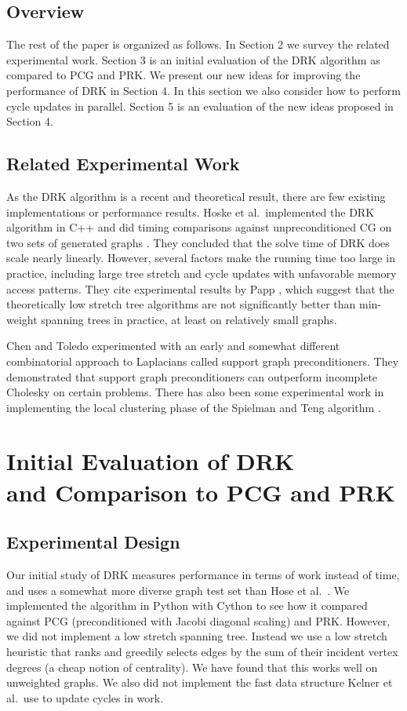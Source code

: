 \documentclass{sig-alternate}
\begin{document}
\subsection{Overview}
The rest of the paper is organized as follows.
In Section 2 we survey  the related experimental work.
Section 3 is an initial evaluation of the DRK algorithm
as compared to PCG and PRK.
We present our new ideas for improving the performance of DRK in Section 4.
In this section we also consider how to perform cycle updates
in parallel.
Section 5 is an evaluation of the new ideas proposed in Section 4.

\subsection{Related Experimental Work}
As the DRK algorithm is a recent and theoretical
result, there are few existing implementations or performance results.
Hoske et al.\ implemented the DRK algorithm in C++ and did timing comparisons
against unpreconditioned CG on two sets of generated graphs \cite{HLMW15}.
They concluded that the solve time of DRK
does scale nearly linearly.
However, several factors make the running time too large in practice,
including large tree stretch and cycle updates
with unfavorable memory access patterns.
They cite
experimental results by Papp \cite{Paap2014}, which
suggest that the theoretically low stretch tree algorithms
are not significantly better than min-weight spanning trees in
practice, at least on relatively small graphs.

Chen and Toledo \cite{ChenToledo2003} experimented with
an early and somewhat different combinatorial approach to Laplacians
called support graph preconditioners. They demonstrated that support graph
preconditioners can outperform incomplete Cholesky on certain problems.
There has also been some experimental work in implementing the local
clustering phase of the Spielman and Teng algorithm \cite{ZLM2013}.

\section[Initial Evaluation of DRK and Comparison to PCG and PRK]
{Initial Evaluation of DRK\\and Comparison to PCG and PRK}

\subsection{Experimental Design}
Our initial study of DRK measures performance in terms of
work instead of time, and uses a somewhat more diverse graph test set
than Hose et al.\ \cite{HLMW15}.
We implemented the algorithm in Python with Cython to see how it compared
against PCG (preconditioned with Jacobi diagonal scaling) and PRK.
However, we did
not implement a low stretch spanning tree.
Instead we use a low stretch heuristic that ranks and greedily
selects edges by the sum
of their incident vertex degrees (a cheap notion of centrality).
We have found that this works well on unweighted graphs.
We also did not implement
the fast data structure Kelner et al.\ use to update cycles in 
work.
\end{document}

